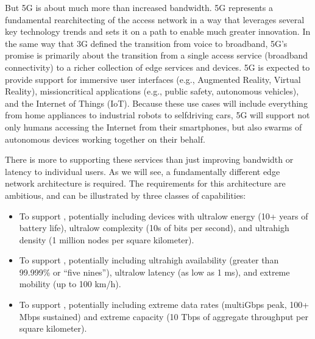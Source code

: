 \documentclass[a4paper,11pt,english]{sphinxmanual}
\begin{document}
\sphinxAtStartPar
But 5G is about much more than increased bandwidth. 5G represents a
fundamental rearchitecting of the access network in a way that
leverages several key technology trends and sets it on a path to
enable much greater innovation. In the same way that 3G defined the
transition from voice to broadband, 5G’s promise is primarily about
the transition from a single access service (broadband connectivity)
to a richer collection of edge services and devices. 5G is expected to
provide support for immersive user interfaces (e.g., Augmented Reality,
Virtual Reality), mission\sphinxhyphen{}critical applications (e.g., public safety,
autonomous vehicles), and the Internet of Things (IoT). Because these
use cases will include everything from home appliances to industrial
robots to self\sphinxhyphen{}driving cars, 5G will support not only humans accessing
the Internet from their smartphones, but also swarms of autonomous
devices working together on their behalf.

\sphinxAtStartPar
There is more to supporting these services than just improving
bandwidth or latency to individual users. As we will see, a
fundamentally different edge network architecture is required. The
requirements for this architecture are ambitious, and can be
illustrated by three classes of capabilities:
\begin{itemize}
\item {} 
\sphinxAtStartPar
To support , potentially including
devices with ultra\sphinxhyphen{}low energy (10+ years of battery life), ultra\sphinxhyphen{}low
complexity (10s of bits per second), and ultra\sphinxhyphen{}high density (1
million nodes per square kilometer).

\item {} 
\sphinxAtStartPar
To support , potentially including
ultra\sphinxhyphen{}high availability (greater than 99.999\% or “five nines”),
ultra\sphinxhyphen{}low latency (as low as 1 ms), and extreme mobility (up to 100
km/h).

\item {} 
\sphinxAtStartPar
To support , potentially including extreme
data rates (multi\sphinxhyphen{}Gbps peak, 100+ Mbps sustained) and extreme
capacity (10 Tbps of aggregate throughput per square kilometer).

\end{itemize}
\end{document}
